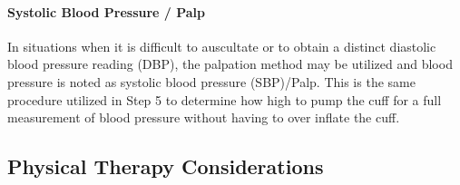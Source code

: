 \paragraph{Systolic Blood Pressure / Palp}

In situations when it is difficult to auscultate or to obtain a distinct diastolic blood pressure reading (DBP), the palpation method may be utilized and blood pressure is noted as systolic blood pressure (SBP)/Palp. This is the same procedure utilized in Step 5 to determine how high to pump the cuff for a full measurement of blood pressure without having to over inflate the cuff.


\subsection{Physical Therapy Considerations}
